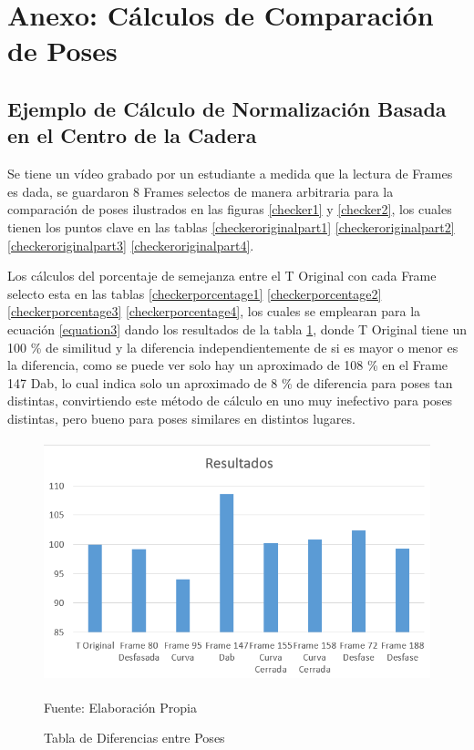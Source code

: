 \clearpage
\section{Anexo: Cálculos de Comparación de Poses}

\subsection{Ejemplo de Cálculo de Normalización Basada en el Centro de la Cadera}

Se tiene un vídeo grabado por un estudiante a medida que la lectura de Frames es dada, se guardaron 8 Frames selectos de manera arbitraria para la comparación de poses ilustrados en las figuras \ref{checker1} y \ref{checker2}, los cuales tienen los puntos clave en las tablas \ref{checkeroriginalpart1} \ref{checkeroriginalpart2} \ref{checkeroriginalpart3} \ref{checkeroriginalpart4}.

Los cálculos del porcentaje de semejanza entre el T Original con cada Frame selecto esta en las tablas \ref{checkerporcentage1} \ref{checkerporcentage2} \ref{checkerporcentage3} \ref{checkerporcentage4}, los cuales se emplearan para la ecuación \ref{equation3} dando los resultados de la tabla \ref{resultadoschecker}, donde T Original tiene un 100 \% de similitud y la diferencia independientemente de si es mayor o menor es la diferencia, como se puede ver solo hay un aproximado de 108 \% en el Frame 147 Dab, lo cual indica solo un aproximado de 8 \% de diferencia para poses tan distintas, convirtiendo este método de cálculo en uno muy inefectivo para poses distintas, pero bueno para poses similares en distintos lugares.

\begin{figure}[ht]
	\centering
	\includegraphics[width=12cm,height=7cm]{./Images/resultadoschecker.png}
	\caption{Tabla de Diferencias entre Poses}
	\footnotesize Fuente: Elaboración Propia
	\label{resultadoschecker}
\end{figure}

